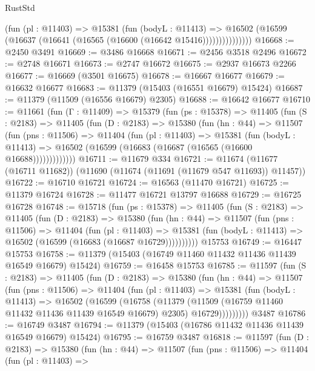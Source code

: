 \begin{lexlean}{RustStd}
\begin{coremodule}
                  (fun (pl : @11403) =>
                  @15381
                    (fun (bodyL : @11413) =>
                    @16502 (@16599 (@16637 (@16641 (@16565 (@16600 (@16642 @15416)))))))))))))))
@16668 := @2450 @3491
@16669 := @3486 @16668
@16671 := @2456 @3518 @2496
@16672 := @2748 @16671
@16673 := @2747 @16672
@16675 := @2937 @16673 @2266
@16677 := @16669 (@3501 @16675)
@16678 := @16667 @16677
@16679 := @16632 @16677
@16683 := @11379 (@15403 (@16551 @16679) @15424)
@16687 := @11379 (@11509 (@16556 @16679) @2305)
@16688 := @16642 @16677
@16710 := @11661
    (fun (Γ : @11409) =>
    @15379
      (fun (ps : @15378) =>
      @11405
        (fun (S : @2183) =>
        @11405
          (fun (D : @2183) =>
          @15380
            (fun (hn : @44) =>
            @11507
              (fun (pns : @11506) =>
              @11404
                (fun (pl : @11403) =>
                @15381
                  (fun (bodyL : @11413) =>
                  @16502 (@16599 (@16683 (@16687 (@16565 (@16600 @16688)))))))))))))
@16711 := @11679 @334
@16721 := @11674 (@11677 (@16711 @11682)) (@11690 (@11674 (@11691 (@11679 @547 @11693)) @11457))
@16722 := @16710 @16721
@16724 := @16563 (@11470 @16721)
@16725 := @11379 @16724
@16728 := @11477 @16721 @13797 @16688
@16729 := @16725 @16728
@16748 := @15718
    (fun (ps : @15378) =>
    @11405
      (fun (S : @2183) =>
      @11405
        (fun (D : @2183) =>
        @15380
          (fun (hn : @44) =>
          @11507
            (fun (pns : @11506) =>
            @11404
              (fun (pl : @11403) =>
              @15381 (fun (bodyL : @11413) => @16502 (@16599 (@16683 (@16687 @16729))))))))))
    @15753
@16749 := @16447 @15753
@16758 := @11379 (@15403 (@16749 @11460 @11432 @11436 @11439 @16549 @16679) @15424)
@16759 := @16458 @15753
@16785 := @11597
    (fun (S : @2183) =>
    @11405
      (fun (D : @2183) =>
      @15380
        (fun (hn : @44) =>
        @11507
          (fun (pns : @11506) =>
          @11404
            (fun (pl : @11403) =>
            @15381
              (fun (bodyL : @11413) =>
              @16502
                (@16599
                  (@16758
                    (@11379
                      (@11509 (@16759 @11460 @11432 @11436 @11439 @16549 @16679) @2305)
                      @16729)))))))))
    @3487
@16786 := @16749 @3487
@16794 := @11379 (@15403 (@16786 @11432 @11436 @11439 @16549 @16679) @15424)
@16795 := @16759 @3487
@16818 := @11597
    (fun (D : @2183) =>
    @15380
      (fun (hn : @44) =>
      @11507
        (fun (pns : @11506) =>
        @11404
          (fun (pl : @11403) =>

\end{coremodule}
\end{lexlean}
